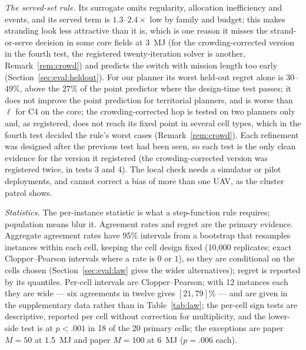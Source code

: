 \documentclass[journal,outdir=./]{IEEEtran}
\begin{document}
\textit{The served-set rule.} Its surrogate omits regularity, allocation inefficiency and events, and its served term is $1.3$--$2.4\times$ low by family and budget; this makes stranding look less attractive than it is, which is one reason it misses the strand-or-serve decision in some core fields at 3~MJ (for the crowding-corrected version in the fourth test, the registered twenty-iteration solver is another, Remark~\ref{rem:crowd}) and predicts the switch with mission length too early (Section~\ref{sec:eval:heldout}). For our planner its worst held-out regret alone is $30$--$49\%$, above the $27\%$ of the point predictor where the design-time test passes; it does not improve the point prediction for territorial planners, and is worse than $\ell$ for C4 on the core; the crowding-corrected hop is tested on two planners only and, as registered, does not reach its fixed point in several cell types, which in the fourth test decided the rule's worst cases (Remark~\ref{rem:crowd}). Each refinement was designed after the previous test had been seen, so each test is the only clean evidence for the version it registered (the crowding-corrected version was registered twice, in tests 3 and 4). The local check needs a simulator or pilot deployments, and cannot correct a bias of more than one UAV, as the cluster patrol shows.

\textit{Statistics.} The per-instance statistic is what a step-function rule requires; population means blur it. Agreement rates and regret are the primary evidence. Aggregate agreement rates have 95\% intervals from a bootstrap that resamples instances within each cell, keeping the cell design fixed (10{,}000 replicates; exact Clopper--Pearson intervals where a rate is $0$ or $1$), so they are conditional on the cells chosen (Section~\ref{sec:eval:law} gives the wider alternatives); regret is reported by its quantiles. Per-cell intervals are Clopper--Pearson; with 12 instances each they are wide --- six agreements in twelve gives $[21,79]\%$ --- and are given in the supplementary data rather than in Table~\ref{tab:law}; the per-cell sign tests are descriptive, reported per cell without correction for multiplicity, and the lower-side test is at $p<.001$ in 18 of the 20 primary cells; the exceptions are paper $M=50$ at 1.5~MJ and paper $M=100$ at 6~MJ ($p=.006$ each).
\end{document}
